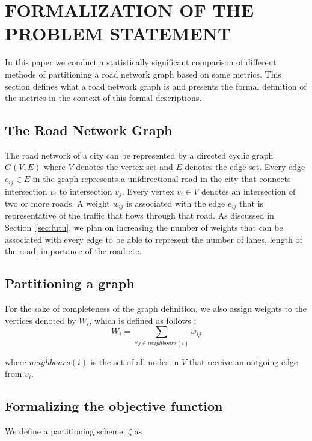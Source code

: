 \section{FORMALIZATION OF THE PROBLEM STATEMENT}
\label{sec:form}

In this paper we conduct a statistically significant comparison of different methods of partitioning a road network graph based on some metrics. This section defines what a road network graph is and presents the formal definition of the metrics in the context of this formal descriptions.

\subsection{The Road Network Graph}
\label{sec:form-road-netw-grap}
The road network of a city can be represented by a directed cyclic graph~\cite{holden1995mathematical} $G(V, E)$ where $V$ denotes the vertex set and $E$ denotes the edge set. Every edge $e_{ij} \in E$ in the graph represents a unidirectional road in the city that connects intersection $v_i$ to intersection $v_j$. Every vertex $v_i \in V$ denotes an intersection of two or more roads. A weight $w_{ij}$ is associated with the edge $e_{ij}$ that is representative of the traffic that flows through that road. As discussed in Section~\ref{sec:futu}, we plan on increasing the number of weights that can be associated with every edge to be able to represent the number of lanes, length of the road, importance of the road etc.

\subsection{Partitioning a graph}
\label{sec:form-part}
For the sake of completeness of the graph definition, we also assign weights to the vertices denoted by $W_i$, which is defined as follows :
\begin{equation}
\label{eq:vertex-weight}
W_i = \sum\limits_{\forall j \in neighbours(i)} w_{ij}
\end{equation}

where $neighbours(i)$ is the set of all nodes in $V$ that receive an outgoing edge from $v_i$.


\subsection{Formalizing the objective function}
\label{sec:form-obje-func}

We define a partitioning scheme, $\zeta$ as 

